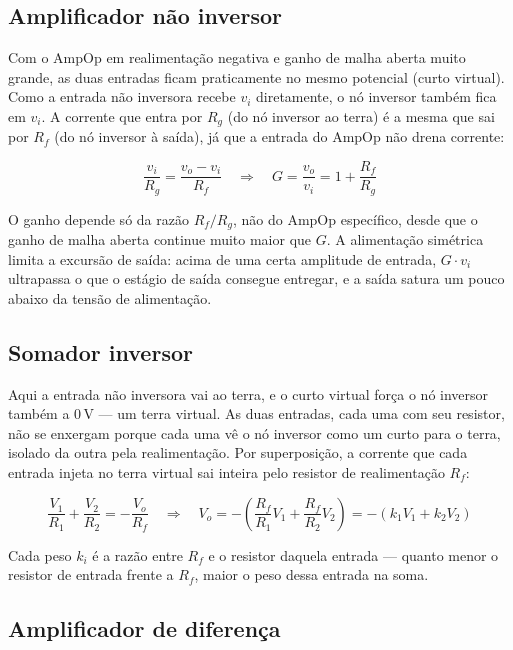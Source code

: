 \documentclass[11pt,a4paper]{article}
\begin{document}
\subsection{Amplificador não inversor}

Com o AmpOp em realimentação negativa e ganho de malha aberta muito grande, as duas entradas
ficam praticamente no mesmo potencial (curto virtual). Como a entrada não inversora recebe
$v_i$ diretamente, o nó inversor também fica em $v_i$. A corrente que entra por $R_g$ (do nó
inversor ao terra) é a mesma que sai por $R_f$ (do nó inversor à saída), já que a entrada do
AmpOp não drena corrente:

\begin{equation}
\frac{v_i}{R_g} = \frac{v_o - v_i}{R_f} \quad\Rightarrow\quad
G = \frac{v_o}{v_i} = 1 + \frac{R_f}{R_g}
\label{eq:naoinversor}
\end{equation}

O ganho depende só da razão $R_f/R_g$, não do AmpOp específico, desde que o ganho de malha
aberta continue muito maior que $G$. A alimentação simétrica limita a excursão de saída: acima
de uma certa amplitude de entrada, $G\cdot v_i$ ultrapassa o que o estágio de saída consegue
entregar, e a saída satura um pouco abaixo da tensão de alimentação.

\subsection{Somador inversor}

Aqui a entrada não inversora vai ao terra, e o curto virtual força o nó inversor também a
$0\,\text{V}$ — um terra virtual. As duas entradas, cada uma com seu resistor, não se enxergam
porque cada uma vê o nó inversor como um curto para o terra, isolado da outra pela realimentação.
Por superposição, a corrente que cada entrada injeta no terra virtual sai inteira pelo resistor
de realimentação $R_f$:

\begin{equation}
\frac{V_1}{R_1}+\frac{V_2}{R_2} = -\frac{V_o}{R_f}
\quad\Rightarrow\quad
V_o = -\left(\frac{R_f}{R_1}V_1+\frac{R_f}{R_2}V_2\right) = -(k_1V_1+k_2V_2)
\label{eq:somador}
\end{equation}

Cada peso $k_i$ é a razão entre $R_f$ e o resistor daquela entrada — quanto menor o resistor de
entrada frente a $R_f$, maior o peso dessa entrada na soma.

\subsection{Amplificador de diferença}
\end{document}
